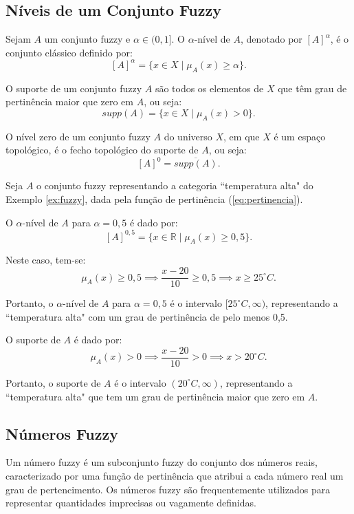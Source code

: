 \subsection{Níveis de um Conjunto Fuzzy}
\begin{definicao}
    Sejam $A$ um conjunto fuzzy e $\alpha \in (0,1]$. O $\alpha$-nível de $A$, denotado por $[A]^{\alpha}$, é o conjunto clássico definido por:
$$[A]^{\alpha} = \{x \in X \mid \mu_A(x) \geq \alpha\}.$$
\end{definicao}

\begin{definicao}
    O suporte de um conjunto fuzzy $A$ são todos os elementos de $X$ que têm grau de pertinência maior que zero em $A$, ou seja:
$$supp(A) = \{x \in X \mid \mu_A(x) > 0\}.$$
\end{definicao}

\begin{definicao}
    O nível zero de um conjunto fuzzy $A$ do universo $X$, em que $X$ é um espaço topológico, é o fecho topológico do suporte de $A$, ou seja:
$$[A]^0 = \overline{supp(A)}.$$
\end{definicao}




\begin{exemplo}
Seja $A$ o conjunto fuzzy representando a categoria ``temperatura alta" do Exemplo \ref{ex:fuzzy}, dada pela função de pertinência (\ref{eq:pertinencia}).
\end{exemplo}
 O $\alpha$-nível de $A$ para $\alpha = 0,5$ é dado por:
$$[A]^{0,5} = \{x \in \mathbb{R} \mid \mu_A(x) \geq 0,5\}.$$

Neste caso, tem-se:
$$\mu_A(x) \geq 0,5 \implies \frac{x - 20}{10} \geq 0,5 \implies x \geq 25^\circ C.$$

Portanto, o $\alpha$-nível de $A$ para $\alpha = 0,5$ é o intervalo $[25^\circ C, \infty)$, representando a ``temperatura alta" com um grau de pertinência de pelo menos 0,5.

O suporte de $A$ é dado por:
$$\mu_A(x) > 0 \implies \frac{x - 20}{10} > 0 \implies x > 20^\circ C.$$

Portanto, o suporte de $A$ é o intervalo $(20^\circ C, \infty)$, representando a ``temperatura alta" que tem um grau de pertinência maior que zero em $A$.


\subsection{Números Fuzzy}
Um número fuzzy é um subconjunto fuzzy do conjunto dos números reais, caracterizado por uma função de pertinência que atribui a cada número real um grau de pertencimento. Os números fuzzy são frequentemente utilizados para representar quantidades imprecisas ou vagamente definidas.

